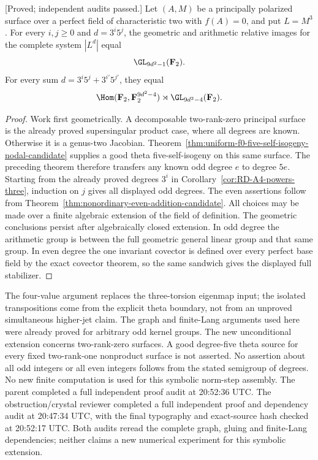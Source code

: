 \begin{corollary}
\label{cor:f0-three-five-degree-groups-candidate}
\textup{[Proved; independent audits passed.]}
Let $(A,M)$ be a principally polarized surface over a perfect field
of characteristic two with $f(A)=0$, and put $L=M^3$.
For every $i,j\ge0$ and $d=3^i5^j$, the geometric and arithmetic
relative images for the complete system $|L^d|$ equal
\[
                           \GL_{9d^2-1}(\mathbf F_2).
\]
For every sum $d=3^i5^j+3^{i'}5^{j'}$, they equal
\[
 \Hom(\mathbf F_2,\mathbf F_2^{9d^2-4})
                          \rtimes\GL_{9d^2-4}(\mathbf F_2).
\]
\end{corollary}
\begin{proof}
Work first geometrically. A decomposable two-rank-zero principal
surface is the already proved supersingular product case, where
all degrees are known. Otherwise it is a genus-two Jacobian.
Theorem~\ref{thm:uniform-f0-five-self-isogeny-nodal-candidate}
supplies a good theta five-self-isogeny on this same surface.
The preceding theorem therefore transfers any known odd degree
$e$ to degree $5e$. Starting from the already proved degrees
$3^i$ in Corollary~\ref{cor:RD-A4-powers-three}, induction on $j$
gives all displayed odd degrees. The even assertions follow from
Theorem~\ref{thm:nonordinary-even-addition-candidate}.
All choices may be made over a finite algebraic extension of the
field of definition. The geometric conclusions persist after
algebraically closed extension. In odd degree the arithmetic
group is between the full geometric general linear group and
that same group. In even degree the one invariant covector is
defined over every perfect base field by the exact covector
theorem, so the same sandwich gives the displayed full stabilizer.
\end{proof}

\begin{remark}
\label{rem:good-theta-norm-transfer-scope-candidate}
The four-value argument replaces the three-torsion eigenmap input;
the isolated transpositions come from the explicit theta boundary,
not from an unproved simultaneous higher-jet claim. The graph and
finite-Lang arguments used here were already proved for arbitrary
odd kernel groups. The new unconditional extension concerns
two-rank-zero surfaces. A good degree-five theta source for every
fixed two-rank-one nonproduct surface is not asserted. No assertion
about all odd integers or all even integers follows from the stated
semigroup of degrees. No new finite computation is used for this
symbolic norm-step assembly. The parent completed a full independent proof audit at 20:52:36 UTC. The obstruction/crystal reviewer completed a full independent proof and dependency audit at 20:47:34 UTC, with the final typography and exact-source hash checked at 20:52:17 UTC. Both audits reread the complete graph, gluing and finite-Lang dependencies; neither claims a new numerical experiment for this symbolic extension.
\end{remark}
